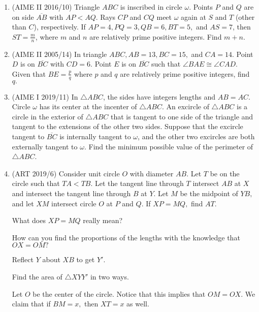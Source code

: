 \begin{enumerate}
    \item (AIME II 2016/10) Triangle $ABC$ is inscribed in circle $\omega$. Points $P$ and $Q$ are on side $\overline{AB}$ with $AP<AQ$. Rays $CP$ and $CQ$ meet $\omega$ again at $S$ and $T$ (other than $C$), respectively. If $AP=4,PQ=3,QB=6,BT=5,$ and $AS=7$, then $ST=\frac{m}{n}$, where $m$ and $n$ are relatively prime positive integers. Find $m+n$.
    
    \item (AIME II 2005/14) In triangle $ABC, AB=13, BC=15,$ and $CA = 14.$ Point $D$ is on $\overline{BC}$ with $CD=6.$ Point $E$ is on $\overline{BC}$ such that $\angle BAE\cong \angle CAD.$ Given that $BE=\frac pq$ where $p$ and $q$ are relatively prime positive integers, find $q.$
    
    \item (AIME I 2019/11) In $\triangle ABC$, the sides have integers lengths and $AB=AC$. Circle $\omega$ has its center at the incenter of $\triangle ABC$. An excircle of $\triangle ABC$ is a circle in the exterior of $\triangle ABC$ that is tangent to one side of the triangle and tangent to the extensions of the other two sides. Suppose that the excircle tangent to $\overline{BC}$ is internally tangent to $\omega$, and the other two excircles are both externally tangent to $\omega$. Find the minimum possible value of the perimeter of $\triangle ABC$.

    \item (ART 2019/6) Consider unit circle $O$ with diameter $AB.$ Let $T$ be on the circle such that $TA<TB.$ Let the tangent line through $T$ intersect $AB$ at $X$ and intersect the tangent line through $B$ at $Y.$ Let $M$ be the midpoint of $YB,$ and let $XM$ intersect circle $O$ at $P$ and $Q.$ If $XP=MQ,$ find $AT.$
    \begin{hint}
    \begin{addhint}
    {What does $XP=MQ$ really mean?}
    \end{addhint}
    \begin{addhint}
    {How can you find the proportions of the lengths with the knowledge that $OX=OM?$}
    \end{addhint}
    \begin{addhint}
    {Reflect $Y$ about $XB$ to get $Y'.$}
    \end{addhint}
    \begin{addhint}
    {Find the area of $\triangle XYY'$ in two ways.}
    \end{addhint}
    \end{hint}
    \begin{solu}
    \begin{addsol}
    {Let $O$ be the center of the circle. Notice that this implies that $OM=OX.$ We claim that if $BM=x,$ then $XT=x$ as well.
    
}
\end{addsol}
\end{solu}
\end{enumerate}
